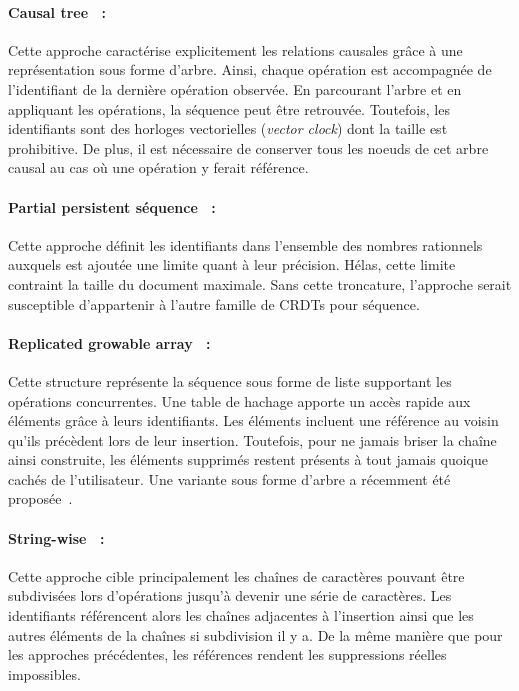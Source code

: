 \paragraph{Causal tree~\cite{grishchenko2010deep} :} Cette approche caractérise
explicitement les relations causales grâce à une représentation sous forme
d'arbre. Ainsi, chaque opération est accompagnée de l'identifiant de la dernière
opération observée. En parcourant l'arbre et en appliquant les opérations, la
séquence peut être retrouvée. Toutefois, les identifiants sont des horloges
vectorielles (\emph{vector clock}) dont la taille est prohibitive. De plus, il
est nécessaire de conserver tous les noeuds de cet arbre causal au cas où une
opération y ferait référence.

\paragraph{Partial persistent séquence~\cite{wu2010partial} :} Cette approche
définit les identifiants dans l'ensemble des nombres rationnels auxquels est
ajoutée une limite quant à leur précision. Hélas, cette limite contraint la
taille du document maximale. Sans cette troncature, l'approche serait
susceptible d'appartenir à l'autre famille de CRDTs pour séquence.

\paragraph{Replicated growable array~\cite{roh2011replicated} :} Cette structure
représente la séquence sous forme de liste supportant les opérations
concurrentes. Une table de hachage apporte un accès rapide aux éléments grâce à
leurs identifiants. Les éléments incluent une référence au voisin qu'ils
précèdent lors de leur insertion. Toutefois, pour ne jamais briser la chaîne
ainsi construite, les éléments supprimés restent présents à tout jamais
quoique cachés de l'utilisateur. Une variante sous forme d'arbre a récemment été
proposée~\cite{attiya2016specification}.

\paragraph{String-wise~\cite{yu2012stringwise} :} Cette approche cible
principalement les chaînes de caractères pouvant être subdivisées lors
d'opérations jusqu'à devenir une série de caractères. Les identifiants
référencent alors les chaînes adjacentes à l'insertion ainsi que les autres
éléments de la chaînes si subdivision il y a. De la même manière que pour les
approches précédentes, les références rendent les suppressions réelles
impossibles.

